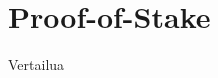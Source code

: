 \section{Proof-of-Stake\label{spacemint}}
\begin{otherlanguage}{english}

Vertailua

\end{otherlanguage}
